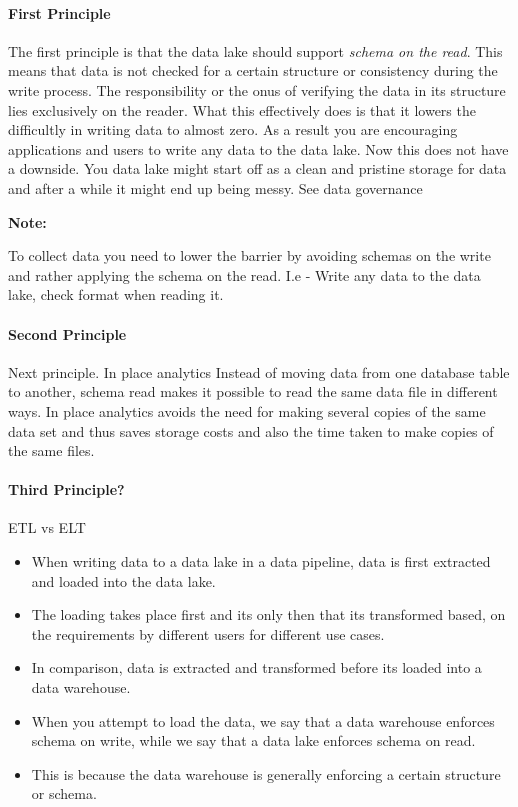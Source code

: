\documentclass[a4paper, 11pt]{book}
\newenvironment{note}{
    \begin{siderule}
        \textbf{Note: }
        }{
    \end{siderule}}
\begin{document}
    \paragraph{First Principle}
    The first principle is that the data lake should support \textit{schema on the read}.
    This means that data is not checked for a certain structure or consistency during the write process.
    The responsibility or the onus of verifying the data in its structure lies exclusively on the reader.
    What this effectively does is that it lowers the difficultly in writing data to almost zero.
    As a result you are encouraging applications and users to write any data to the data lake. %
    Now this does not have a downside.
    You data lake might start off as a clean and pristine storage for data and after a while it might end up being messy.
    See data governance

    \begin{note}
        To collect data you need to lower the barrier by avoiding schemas on the write and rather applying the schema on the read.
        I.e - Write any data to the data lake, check format when reading it.
    \end{note}

    \paragraph{Second Principle}
    Next principle.
    In place analytics
    Instead of moving data from one database table to another, schema read makes it possible to read the same data file in different ways.
    In place analytics avoids the need for making several copies of the same data set and thus saves storage costs and also the time taken to make copies of the same files.

    \paragraph{Third Principle?}
    ETL vs ELT
    \begin{itemize}
        \item When writing data to a data lake in a data pipeline, data is first extracted and loaded into the data lake.
        \item The loading takes place first and its only then that its transformed based, on the requirements by different users for different use cases.
        \item In comparison, data is extracted and transformed before its loaded into a data warehouse.
        \item When you attempt to load the data, we say that a data warehouse enforces schema on write, while we say that a data lake enforces schema on read.
        \item This is because the data warehouse is generally enforcing a certain structure or schema.
    \end{itemize}
\end{document}
